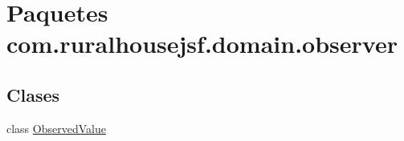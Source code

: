 \hypertarget{namespacecom_1_1ruralhousejsf_1_1domain_1_1observer}{}\section{Paquetes com.\+ruralhousejsf.\+domain.\+observer}
\label{namespacecom_1_1ruralhousejsf_1_1domain_1_1observer}
\subsection*{Clases}
\begin{DoxyCompactItemize}
\item 
class \mbox{\hyperlink{classcom_1_1ruralhousejsf_1_1domain_1_1observer_1_1_observed_value}{Observed\+Value}}
\end{DoxyCompactItemize}
